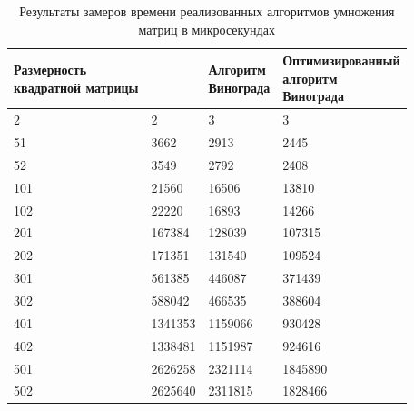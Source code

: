 \begin{table}[h]
	\begin{center}
		\begin{flushleft}
		\caption{\label{tab:time}Результаты замеров времени реализованных алгоритмов умножения матриц в микросекундах}
		\end{flushleft}
		\begin{tabular}{| l | l | l | l |}
			\hline \specialcell{Размерность\\квадратной матрицы} & \specialcell{Стандартный} &
			\specialcell{Алгоритм\\Винограда} & \specialcell{Оптимизированный\\алгоритм\\Винограда} \\\hline
			2   & 2       & 3       & 3       \\ \hline
			51  & 3662    & 2913    & 2445    \\ \hline
			52  & 3549    & 2792    & 2408    \\ \hline
			101 & 21560   & 16506   & 13810   \\ \hline
			102 & 22220   & 16893   & 14266   \\ \hline
			201 & 167384  & 128039  & 107315  \\ \hline
			202 & 171351  & 131540  & 109524  \\ \hline
			301 & 561385  & 446087  & 371439  \\ \hline
			302 & 588042  & 466535  & 388604  \\ \hline
			401 & 1341353 & 1159066 & 930428  \\ \hline
			402 & 1338481 & 1151987 & 924616  \\ \hline
			501 & 2626258 & 2321114 & 1845890 \\ \hline
			502 & 2625640 & 2311815 & 1828466 \\ \hline
		\end{tabular}
	\end{center}
\end{table}

